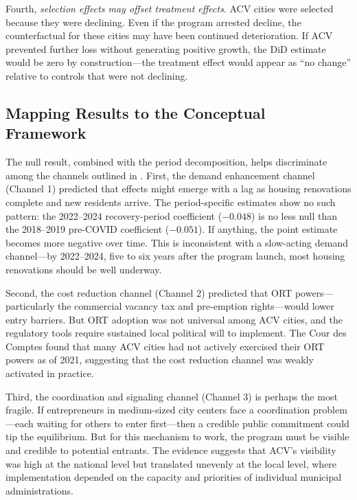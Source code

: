 \documentclass[12pt]{article}
\begin{document}
Fourth, \textit{selection effects may offset treatment effects}. ACV cities were selected because they were declining. Even if the program arrested decline, the counterfactual for these cities may have been continued deterioration. If ACV prevented further loss without generating positive growth, the DiD estimate would be zero by construction---the treatment effect would appear as ``no change'' relative to controls that were not declining.

\subsection{Mapping Results to the Conceptual Framework}

The null result, combined with the period decomposition, helps discriminate among the channels outlined in . First, the demand enhancement channel (Channel 1) predicted that effects might emerge with a lag as housing renovations complete and new residents arrive. The period-specific estimates show no such pattern: the 2022--2024 recovery-period coefficient ($-0.048$) is no less null than the 2018--2019 pre-COVID coefficient ($-0.051$). If anything, the point estimate becomes more negative over time. This is inconsistent with a slow-acting demand channel---by 2022--2024, five to six years after the program launch, most housing renovations should be well underway.

Second, the cost reduction channel (Channel 2) predicted that ORT powers---particularly the commercial vacancy tax and pre-emption rights---would lower entry barriers. But ORT adoption was not universal among ACV cities, and the regulatory tools require sustained local political will to implement. The Cour des Comptes \citeyearpar{courdescomptes2022} found that many ACV cities had not actively exercised their ORT powers as of 2021, suggesting that the cost reduction channel was weakly activated in practice.

Third, the coordination and signaling channel (Channel 3) is perhaps the most fragile. If entrepreneurs in medium-sized city centers face a coordination problem---each waiting for others to enter first---then a credible public commitment could tip the equilibrium. But for this mechanism to work, the program must be visible and credible to potential entrants. The evidence suggests that ACV's visibility was high at the national level but translated unevenly at the local level, where implementation depended on the capacity and priorities of individual municipal administrations.
\end{document}
